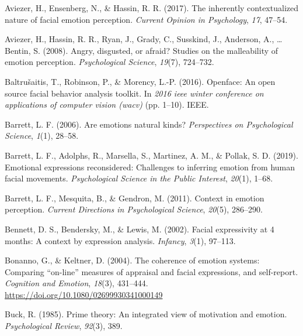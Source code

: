 \documentclass[man]{apa6}
\begin{document}
\begingroup
\setlength{\parindent}{-0.5in}
\setlength{\leftskip}{0.5in}

\hypertarget{refs}{}
\leavevmode\hypertarget{ref-aviezer2017inherently}{}%
Aviezer, H., Ensenberg, N., \& Hassin, R. R. (2017). The inherently contextualized nature of facial emotion perception. \emph{Current Opinion in Psychology}, \emph{17}, 47--54.

\leavevmode\hypertarget{ref-aviezer2008angry}{}%
Aviezer, H., Hassin, R. R., Ryan, J., Grady, C., Susskind, J., Anderson, A., \ldots{} Bentin, S. (2008). Angry, disgusted, or afraid? Studies on the malleability of emotion perception. \emph{Psychological Science}, \emph{19}(7), 724--732.

\leavevmode\hypertarget{ref-baltruvsaitis2016openface}{}%
Baltrušaitis, T., Robinson, P., \& Morency, L.-P. (2016). Openface: An open source facial behavior analysis toolkit. In \emph{2016 ieee winter conference on applications of computer vision (wacv)} (pp. 1--10). IEEE.

\leavevmode\hypertarget{ref-barrett2006emotions}{}%
Barrett, L. F. (2006). Are emotions natural kinds? \emph{Perspectives on Psychological Science}, \emph{1}(1), 28--58.

\leavevmode\hypertarget{ref-barrett2019emotional}{}%
Barrett, L. F., Adolphs, R., Marsella, S., Martinez, A. M., \& Pollak, S. D. (2019). Emotional expressions reconsidered: Challenges to inferring emotion from human facial movements. \emph{Psychological Science in the Public Interest}, \emph{20}(1), 1--68.

\leavevmode\hypertarget{ref-barrett2011context}{}%
Barrett, L. F., Mesquita, B., \& Gendron, M. (2011). Context in emotion perception. \emph{Current Directions in Psychological Science}, \emph{20}(5), 286--290.

\leavevmode\hypertarget{ref-bennett2002facial}{}%
Bennett, D. S., Bendersky, M., \& Lewis, M. (2002). Facial expressivity at 4 months: A context by expression analysis. \emph{Infancy}, \emph{3}(1), 97--113.

\leavevmode\hypertarget{ref-bonanno2004brief}{}%
Bonanno, G., \& Keltner, D. (2004). The coherence of emotion systems: Comparing ``on-line'' measures of appraisal and facial expressions, and self-report. \emph{Cognition and Emotion}, \emph{18}(3), 431--444. \url{https://doi.org/10.1080/02699930341000149}

\leavevmode\hypertarget{ref-buck1985prime}{}%
Buck, R. (1985). Prime theory: An integrated view of motivation and emotion. \emph{Psychological Review}, \emph{92}(3), 389.
\end{document}
